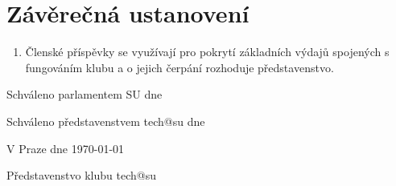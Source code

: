 \documentclass[10pt]{article}
\begin{document}
\section{Závěrečná ustanovení}
	\begin{enumerate}
		\item Členské příspěvky se využívají pro pokrytí základních výdajů spojených s fungováním klubu a o jejich čerpání rozhoduje představenstvo.
	\end{enumerate}

	

\vspace{10mm}
Schváleno parlamentem SU dne

Schváleno představenstvem tech@su dne

\vspace{10mm}

\hfill V Praze dne \today

\hfill Představenstvo klubu tech@su
\end{document}
